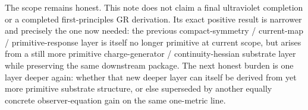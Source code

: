 \documentclass[11pt]{article}
\begin{document}
The scope remains honest. This note does not claim a final ultraviolet completion or a completed first-principles GR derivation. Its exact positive result is narrower and precisely the one now needed: the previous compact-symmetry / current-map / primitive-response layer is itself no longer primitive at current scope, but arises from a still more primitive charge-generator / continuity-hessian substrate layer while preserving the same downstream package. The next honest burden is one layer deeper again: whether that new deeper layer can itself be derived from yet more primitive substrate structure, or else superseded by another equally concrete observer-equation gain on the same one-metric line.
\end{document}
